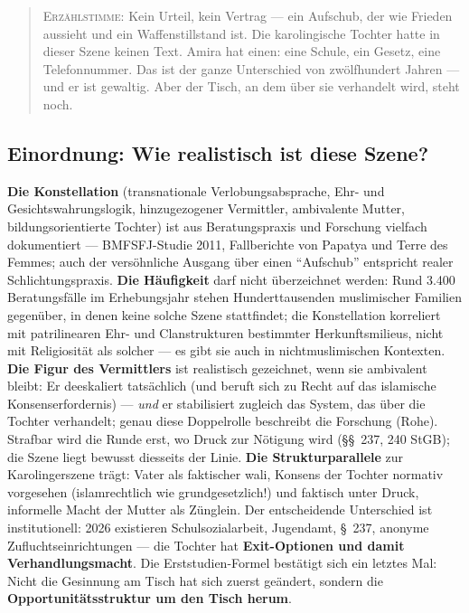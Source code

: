\documentclass[11pt,a4paper,ngerman]{scrartcl}
\newcommand{\chipbase}[2]{\hspace{0pt}{\footnotesize\textcolor{#1}{[\textsc{#2}]}}}
\newcommand{\chipbelegt}[1]{\chipbase{chipgreen}{#1}}
\newcommand{\chipplausibel}[1]{\chipbase{chipamber}{#1}}
\begin{document}
\begin{quotation}
\textsc{Erzählstimme:} Kein Urteil, kein Vertrag --- ein Aufschub, der wie Frieden aussieht und ein Waffenstillstand ist. Die karolingische Tochter hatte in dieser Szene keinen Text. Amira hat einen: eine Schule, ein Gesetz, eine Telefonnummer. Das ist der ganze Unterschied von zwölfhundert Jahren --- und er ist gewaltig. Aber der Tisch, an dem über sie verhandelt wird, steht noch.
\end{quotation}

\subsection*{Einordnung: Wie realistisch ist diese Szene?}
\textbf{Die Konstellation} (transnationale Verlobungsabsprache, Ehr- und Gesichtswahrungslogik, hinzugezogener Vermittler, ambivalente Mutter, bildungsorientierte Tochter) ist aus Beratungspraxis und Forschung vielfach dokumentiert --- BMFSFJ-Studie 2011, Fallberichte von Papatya und Terre des Femmes; auch der versöhnliche Ausgang über einen \enquote{Aufschub} entspricht realer Schlichtungspraxis. \chipbelegt{belegt} \textbf{Die Häufigkeit} darf nicht überzeichnet werden: Rund 3.400 Beratungsfälle im Erhebungsjahr stehen Hunderttausenden muslimischer Familien gegenüber, in denen keine solche Szene stattfindet; die Konstellation korreliert mit patrilinearen Ehr- und Clanstrukturen bestimmter Herkunftsmilieus, nicht mit Religiosität als solcher --- es gibt sie auch in nichtmuslimischen Kontexten. \chipbelegt{belegt} \textbf{Die Figur des Vermittlers} ist realistisch gezeichnet, wenn sie ambivalent bleibt: Er deeskaliert tatsächlich (und beruft sich zu Recht auf das islamische Konsenserfordernis) --- \emph{und} er stabilisiert zugleich das System, das über die Tochter verhandelt; genau diese Doppelrolle beschreibt die Forschung (Rohe). Strafbar wird die Runde erst, wo Druck zur Nötigung wird (\S\S~237, 240 StGB); die Szene liegt bewusst diesseits der Linie. \chipplausibel{plausibel} \textbf{Die Strukturparallele} zur Karolingerszene trägt: Vater als faktischer wali, Konsens der Tochter normativ vorgesehen (islamrechtlich wie grundgesetzlich!) und faktisch unter Druck, informelle Macht der Mutter als Zünglein. Der entscheidende Unterschied ist institutionell: 2026 existieren Schulsozialarbeit, Jugendamt, \S~237, anonyme Zufluchtseinrichtungen --- die Tochter hat \textbf{Exit-Optionen und damit Verhandlungsmacht}. Die Erststudien-Formel bestätigt sich ein letztes Mal: Nicht die Gesinnung am Tisch hat sich zuerst geändert, sondern die \textbf{Opportunitätsstruktur um den Tisch herum}. \chipplausibel{plausibel}
\end{document}

